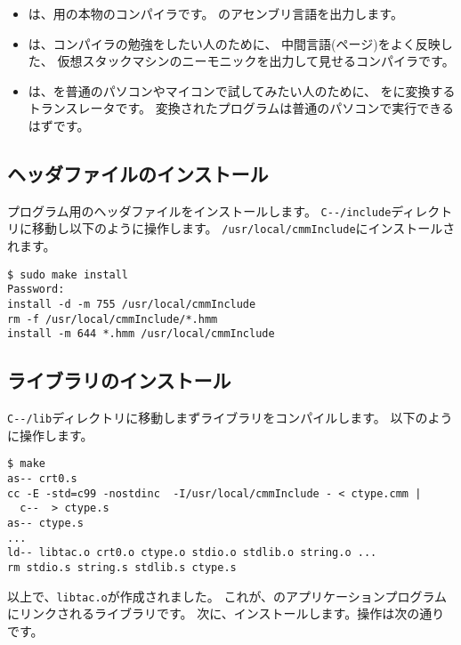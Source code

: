 \begin{itemize}
\item {\cmmc}は、{\tac}用の本物のコンパイラです。
{\tac}のアセンブリ言語を出力します。
\item {\vcmmc}は、コンパイラの勉強をしたい人のために、
中間言語(\pageref{app:vm}ページ)をよく反映した、
仮想スタックマシンのニーモニックを出力して見せるコンパイラです。
\item {\ccmmc}は、{\cmml}を普通のパソコンやマイコンで試してみたい人のために、
{\cmml}を{\cl}に変換するトランスレータです。
変換された{\cl}プログラムは普通のパソコンで実行できるはずです。
\end{itemize}

\subsection{ヘッダファイルのインストール}

{\cmml}プログラム用のヘッダファイルをインストールします。
\verb;C--/include;ディレクトリに移動し以下のように操作します。
\verb;/usr/local/cmmInclude;にインストールされます。

\begin{mylist}
\begin{verbatim}
$ sudo make install
Password:
install -d -m 755 /usr/local/cmmInclude
rm -f /usr/local/cmmInclude/*.hmm
install -m 644 *.hmm /usr/local/cmmInclude
\end{verbatim}
\end{mylist}

\subsection{ライブラリのインストール}

\verb;C--/lib;ディレクトリに移動しまずライブラリをコンパイルします。
以下のように操作します。

\begin{mylist}
\begin{verbatim}
$ make
as-- crt0.s
cc -E -std=c99 -nostdinc  -I/usr/local/cmmInclude - < ctype.cmm |
  c--  > ctype.s
as-- ctype.s
...
ld-- libtac.o crt0.o ctype.o stdio.o stdlib.o string.o ...
rm stdio.s string.s stdlib.s ctype.s
\end{verbatim}
\end{mylist}

以上で、\verb;libtac.o;が作成されました。
これが、{\tacos}のアプリケーションプログラムにリンクされるライブラリです。
次に、インストールします。操作は次の通りです。

